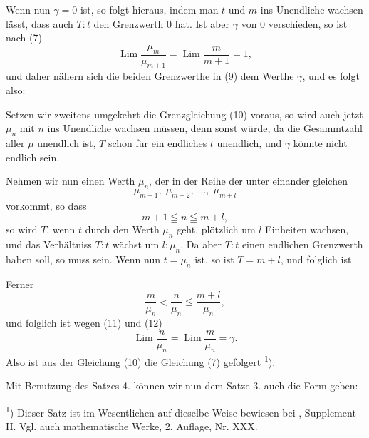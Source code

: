 Wenn nun $\gamma = 0$ ist, so folgt hieraus, indem man $t$ und $m$ ins Unendliche wachsen lässt, dass auch $T : t$ den Grenzwerth 0 hat. Ist aber $\gamma$ von 0 verschieden, so ist nach (7)
\[
\operatorname{Lim} \frac{\mu_m}{\mu_{m+1}} = \operatorname{Lim} \frac{m}{m+1} = 1,
\]
und daher nähern sich die beiden Grenzwerthe in (9) dem Werthe $\gamma$, und es folgt also:

Setzen wir zweitens umgekehrt die Grenzgleichung (10) voraus, so wird auch jetzt $\mu_n$ mit $n$ ins Unendliche wachsen müssen, denn sonst würde, da die Gesammtzahl aller $\mu$ unendlich ist, $T$ schon für ein endliches $t$ unendlich, und $\gamma$ könnte nicht endlich sein.

Nehmen wir nun einen Werth $\mu_n$, der in der Reihe der unter einander gleichen
\[
\mu_{m+1}, \; \mu_{m+2}, \; \dots, \; \mu_{m+l}
\]
vorkommt, so dass
\[
m + 1 \leqq n \leqq m + l,
\]
so wird $T$, wenn $t$ durch den Werth $\mu_n$ geht, plötzlich um $l$ Einheiten wachsen, und das Verhältniss $T : t$ wächst um $l : \mu_n$. Da aber $T : t$ einen endlichen Grenzwerth haben soll, so muss
sein. Wenn nun $t = \mu_n$ ist, so ist $T = m + l$, und folglich ist

Ferner
\[
\frac{m}{\mu_n} < \frac{n}{\mu_n} \leqq \frac{m+l}{\mu_n},
\]
und folglich ist wegen (11) und (12)
\[
\operatorname{Lim} \frac{n}{\mu_n} = \operatorname{Lim} \frac{m}{\mu_n} = \gamma.
\]
Also ist aus der Gleichung (10) die Gleichung (7) gefolgert \textsuperscript{1}).

Mit Benutzung des Satzes 4. können wir nun dem Satze 3. auch die Form geben:

\begingroup
\footnotesize
\textsuperscript{1}) Dieser Satz ist im Wesentlichen auf dieselbe Weise bewiesen bei , Supplement II. Vgl. auch  mathematische Werke, 2. Auflage, Nr. XXX.
\endgroup
